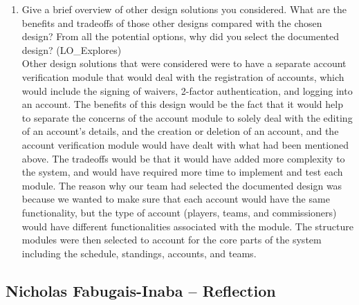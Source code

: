 \documentclass[12pt, titlepage]{article}
\begin{document}
\begin{enumerate}
    \item Give a brief overview of other design solutions you considered. What
    are the benefits and tradeoffs of those other designs compared with the chosen
    design?  From all the potential options, why did you select the documented design?
    (LO\_Explores)\\

    Other design solutions that were considered were to have a separate account verification module
    that would deal with the registration of accounts, which would include the signing of waivers,
    2-factor authentication, and logging into an account. The benefits of this design would be the
    fact that it would help to separate the concerns of the account module to solely deal with the
    editing of an account's details, and the creation or deletion of an account, and the account
    verification module would have dealt with what had been mentioned above. The tradeoffs would
    be that it would have added more complexity to the system, and would have required more time
    to implement and test each module. The reason why our team had selected the documented design
    was because we wanted to make sure that each account would have the same functionality, but
    the type of account (players, teams, and commissioners) would have different functionalities
    associated with the module. The structure modules were then selected to account for the
    core parts of the system including the schedule, standings, accounts, and teams.

\end{enumerate}

\subsection*{Nicholas Fabugais-Inaba -- Reflection}
\end{document}
